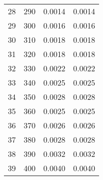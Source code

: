 \begin{table}
\begin{adjustbox}{width=1\textwidth/2}
\begin{tabular}{|c|c|c|c|}
\cline{1-4}
28 & 290 & 0.0014 & 0.0014 \\
\cline{1-4}
29 & 300 & 0.0016 & 0.0016 \\
\cline{1-4}
30 & 310 & 0.0018 & 0.0018 \\
\cline{1-4}
31 & 320 & 0.0018 & 0.0018 \\
\cline{1-4}
32 & 330 & 0.0022 & 0.0022 \\
\cline{1-4}
33 & 340 & 0.0025 & 0.0025 \\
\cline{1-4}
34 & 350 & 0.0028 & 0.0028 \\
\cline{1-4}
35 & 360 & 0.0025 & 0.0025 \\
\cline{1-4}
36 & 370 & 0.0026 & 0.0026 \\
\cline{1-4}
37 & 380 & 0.0028 & 0.0028 \\
\cline{1-4}
38 & 390 & 0.0032 & 0.0032 \\
\cline{1-4}
39 & 400 & 0.0040 & 0.0040 \\
\cline{1-4}
\end{tabular}
\end{adjustbox}
\end{table}

